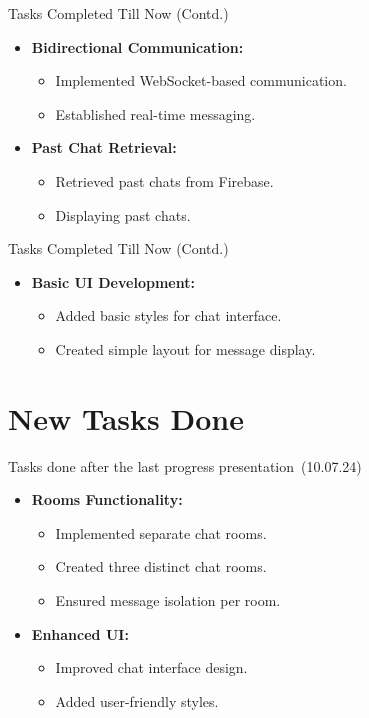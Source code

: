\documentclass{beamer}
\begin{document}
\begin{frame}{Tasks Completed Till Now (Contd.)}
    \begin{itemize}
        \item \textbf{Bidirectional Communication:}
        \begin{itemize}
            \item Implemented WebSocket-based communication.
            \item Established real-time messaging.
        \end{itemize}
        \item \textbf{Past Chat Retrieval:}
        \begin{itemize}
            \item Retrieved past chats from Firebase.
            \item Displaying past chats.
        \end{itemize}
    \end{itemize}
\end{frame}

\begin{frame}{Tasks Completed Till Now (Contd.)}
    \begin{itemize}
        \item \textbf{Basic UI Development:}
        \begin{itemize}
            \item Added basic styles for chat interface.
            \item Created simple layout for message display.
        \end{itemize}
    \end{itemize}
\end{frame}

\section{New Tasks Done}

\begin{frame}{Tasks done after the last progress presentation (10.07.24)}
    \begin{itemize}
        \item \textbf{Rooms Functionality:}
        \begin{itemize}
            \item Implemented separate chat rooms.
            \item Created three distinct chat rooms.
            \item Ensured message isolation per room.
        \end{itemize}
        \item \textbf{Enhanced UI:}
        \begin{itemize}
            \item Improved chat interface design.
            \item Added user-friendly styles.
        \end{itemize}
    \end{itemize}
\end{frame}
\end{document}
